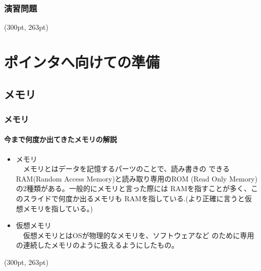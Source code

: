 \documentclass[dvipdfmx]{beamer}
\begin{document}
\begin{frame}[t, fragile]
    \frametitle{演習問題}
    \begin{textblock*}{0.3\linewidth}(300pt, 263pt)
        \space
    \end{textblock*}
\end{frame}

\section{ポインタへ向けての準備}
\subsection{メモリ}
\begin{frame}[t, fragile]
    \frametitle{メモリ}
    \framesubtitle{今まで何度か出てきたメモリの解説}
    \begin{itemize}
        \item メモリ\\
        　メモリとはデータを記憶するパーツのことで、読み書きの
        できるRAM(Random Access Memory)と読み取り専用のROM
        (Read Only Memory)の2種類がある。一般的にメモリと言った際には
        RAMを指すことが多く、このスライドで何度か出るメモリも
        RAMを指している.(より正確に言うと仮想メモリを指している。)
        \item 仮想メモリ\\
        　仮想メモリとはOSが物理的なメモリを、ソフトウェアなど
        のために専用の連続したメモリのように扱えるようにしたもの。
    \end{itemize}
    \begin{textblock*}{0.3\linewidth}(300pt, 263pt)
        \space
    \end{textblock*}
\end{frame}
\end{document}

